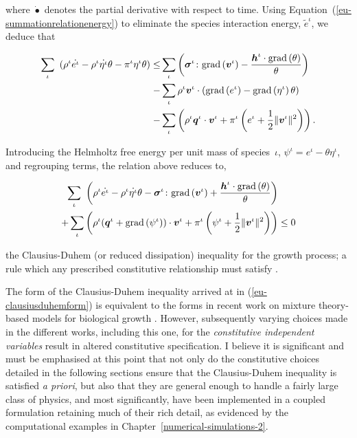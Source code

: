 \noindent where $\dot{\bullet}$ denotes the partial derivative with
respect to time. Using Equation~(\ref{eu-summationrelationenergy}) to
eliminate the species interaction energy, $\tilde{e}^{\iota}$, we
deduce that

\begin{equation*}
\begin{split}
\sum\limits_{\iota}\ \left(\rho^{\iota} \dot{e^{\iota}} -
\rho^{\iota} \dot{\eta^{\iota}} \theta 
 - \pi^{\iota}\eta^{\iota}\theta \right) \leq &
\sum\limits_{\iota} \left(
\mbox{\boldmath$\sigma$}^{\iota}\colon\mathrm{grad}\left(\mbox{\boldmath$ v$}^{\iota}\right)
- \frac{\mbox{\boldmath$ h$}^{\iota}\cdot\mathrm{grad}\left(\theta\right)}{\theta}
\right)\ \\ -& \sum\limits_{\iota}
\rho^{\iota}\mbox{\boldmath$ v$}^{\iota} \cdot\left(
\mathrm{grad} \left(e^{\iota}\right) - \mathrm{grad}\left(\eta^{\iota}
\right)\theta\right) \\ -& \sum\limits_{\iota} \left( \rho^{\iota}\mbox{\boldmath$ q$}^{\iota}\cdot\mbox{\boldmath$ v$}^{\iota} +
 \pi^{\iota} \left(e^\iota + \frac{1}{2} \Vert\mbox{\boldmath$ v$}^\iota\Vert^2\right) \right).
\end{split}
\end{equation*}

Introducing the Helmholtz free energy per unit mass of
species~$\iota$, \mbox{$\psi^\iota = e^\iota - \theta\eta^\iota$}, and
regrouping terms, the relation above reduces to,

\begin{equation}
\begin{split}
\sum\limits_{\iota}\ \bigg(\rho^{\iota} \dot{e^{\iota}} - \rho^{\iota}
\dot{\eta^{\iota}} \theta
-\mbox{\boldmath$\sigma$}^{\iota}\colon\mathrm{grad}\left(\mbox{\boldmath$ v$}^{\iota}\right) +
\frac{\mbox{\boldmath$ h$}^{\iota}\cdot\mathrm{grad}\left(\theta\right)}{\theta} \bigg)
& \\ + \sum\limits_{\iota} \left( \rho^{\iota}
(\mbox{\boldmath$ q$}^{\iota}+\mathrm{grad}\left(\psi^{\iota}\right)) \cdot\mbox{\boldmath$ v$}^{\iota}
+ \pi^{\iota} \left(\psi^{\iota}+\frac{1}{2}
\Vert\mbox{\boldmath$ v$}^\iota\Vert^2\right) \right) & \leq 0
\end{split}
\label{eu-clausiusduhemform}
\end{equation}

\noindent the Clausius-Duhem (or reduced dissipation) inequality for
the growth process; a rule which any prescribed constitutive
relationship must satisfy \citep{TruesdellToupin:60}.

The form of the Clausius-Duhem inequality arrived at in
(\ref{eu-clausiusduhemform}) is equivalent to the forms in recent work
on mixture theory-based models for biological growth \citep{loret05,
  ateshian07}.  However, subsequently varying choices made in the
different works, including this one, for the {\em constitutive
  independent variables} result in altered constitutive
specification. I believe it is significant and must be emphasised at
this point that not only do the constitutive choices detailed in the
following sections ensure that the Clausius-Duhem inequality is
satisfied {\em a priori}, but also that they are general enough to
handle a fairly large class of physics, and most significantly, have
been implemented in a coupled formulation retaining much of their rich
detail, as evidenced by the computational examples in
Chapter~\ref{numerical-simulations-2}.

